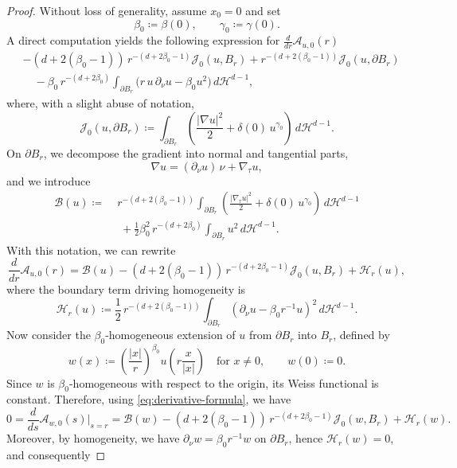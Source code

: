 \documentclass[reqno,11pt]{amsart}
\newcommand{\1}{\mathds{1}}  %
\numberwithin{equation}{section}
\begin{document}
\begin{proof}
Without loss of generality, assume $x_0=0$ and set
\[
    \beta_0 \coloneqq \beta(0), \qquad \gamma_0 \coloneqq \gamma(0).
\]
A direct computation yields the following expression for $\frac{d}{dr}\mathcal{A}_{u,0}(r)$
\begin{align*}
& -(d+2(\beta_0-1))\,r^{-(d+2\beta_0-1)}\mathcal{J}_{0}(u,B_r)
   + r^{-(d+2(\beta_0-1))}\mathcal{J}_{0}(u,\partial B_r) \\
&\quad - \beta_0\,r^{-(d+2\beta_0)}
\int_{\partial B_r}\bigl( r\,u\,\partial_\nu u - \beta_0 u^2 \bigr)\,d\mathcal{H}^{d-1},
\end{align*}
where, with a slight abuse of notation,
\[
    \mathcal{J}_{0}(u,\partial B_r) \coloneqq \int_{\partial B_r}\left(\frac{|\nabla u|^2}{2} + \delta(0)\,u^{\gamma_0}\right)\,d\mathcal{H}^{d-1}.
\]
On $\partial B_r$, we decompose the gradient into normal and tangential parts,
\[
    \nabla u = (\partial_\nu u)\,\nu + \nabla_\tau u,
\]
and we introduce
\begin{align*}
\mathcal{B}(u) \coloneqq\;
& r^{-(d+2(\beta_0-1))}\int_{\partial B_r}\left(\frac{|\nabla_\tau u|^2}{2}+\delta(0)\,u^{\gamma_0}\right)\,d\mathcal{H}^{d-1} \\
&\;+\frac{1}{2}\beta_0^2\,r^{-(d+2\beta_0)}\int_{\partial B_r}u^2\,d\mathcal{H}^{d-1}.
\end{align*}
With this notation, we can rewrite
\begin{equation}\label{eq:derivative-formula}
    \frac{d}{dr}\mathcal{A}_{u,0}(r) = \mathcal{B}(u) - (d+2(\beta_0-1))\,r^{-(d+2\beta_0-1)}\mathcal{J}_{0}(u,B_r) + \mathcal{H}_r(u),
\end{equation}
where the boundary term driving homogeneity is
\[
    \mathcal{H}_r(u) \coloneqq \frac{1}{2}\,r^{-(d+2(\beta_0-1))}
    \int_{\partial B_r}\left(\partial_\nu u - \beta_0 r^{-1}u\right)^2\,d\mathcal{H}^{d-1}.
\]
Now consider the $\beta_0$-homogeneous extension of $u$ from $\partial B_r$ into $B_r$, defined by
\[
    w(x) \coloneqq \left(\frac{|x|}{r}\right)^{\beta_0} u\left(r\frac{x}{|x|}\right)
    \quad \text{for } x\neq 0,
    \qquad
    w(0)\coloneqq 0.
\]
Since $w$ is $\beta_0$-homogeneous with respect to the origin, its Weiss functional is constant. Therefore, using \eqref{eq:derivative-formula}, we have
\[
    0 = \frac{d}{ds}\mathcal{A}_{w,0}(s)\Big|_{s=r}
    = \mathcal{B}(w) -(d+2(\beta_0-1))\,r^{-(d+2\beta_0-1)}\mathcal{J}_{0}(w,B_r)+\mathcal{H}_r(w).
\]
Moreover, by homogeneity, we have $\partial_\nu w=\beta_0 r^{-1}w$ on $\partial B_r$, hence $\mathcal{H}_r(w)=0$, and consequently

\end{proof}
\end{document}
